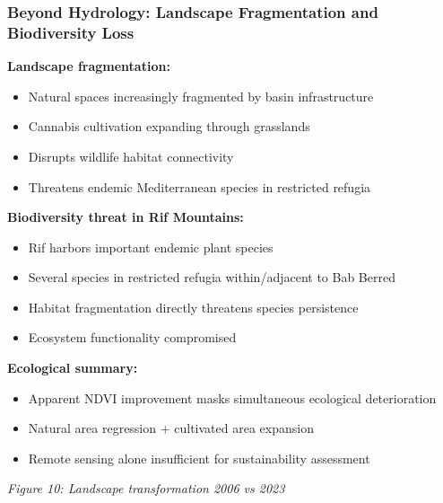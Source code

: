 \documentclass{beamer}
\begin{document}
\begin{frame}
\frametitle{Beyond Hydrology: Landscape Fragmentation and Biodiversity Loss}

\textbf{Landscape fragmentation:}
\begin{itemize}
  \item Natural spaces increasingly fragmented by basin infrastructure
  \item Cannabis cultivation expanding through grasslands
  \item Disrupts wildlife habitat connectivity
  \item Threatens endemic Mediterranean species in restricted refugia
\end{itemize}

\textbf{Biodiversity threat in Rif Mountains:}
\begin{itemize}
  \item Rif harbors important endemic plant species
  \item Several species in restricted refugia within/adjacent to Bab Berred
  \item Habitat fragmentation directly threatens species persistence
  \item Ecosystem functionality compromised
\end{itemize}

\textbf{Ecological summary:}
\begin{itemize}
  \item Apparent NDVI improvement masks simultaneous ecological deterioration
  \item Natural area regression + cultivated area expansion
  \item Remote sensing alone insufficient for sustainability assessment
\end{itemize}

\begin{center}
  \small{\textit{Figure 10: Landscape transformation 2006 vs 2023}}
\end{center}
\end{frame}
\end{document}
